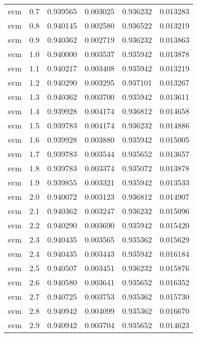 \begin{tabular}{lrrrrr}
     svm &        0.7 &    0.939565 &   0.003025 &   0.936232 &  0.013283 \\
     svm &        0.8 &    0.940145 &   0.002580 &   0.936522 &  0.013219 \\
     svm &        0.9 &    0.940362 &   0.002719 &   0.936232 &  0.013863 \\
     svm &        1.0 &    0.940000 &   0.003537 &   0.935942 &  0.013878 \\
     svm &        1.1 &    0.940217 &   0.003408 &   0.935942 &  0.013219 \\
     svm &        1.2 &    0.940290 &   0.003295 &   0.937101 &  0.013267 \\
     svm &        1.3 &    0.940362 &   0.003700 &   0.935942 &  0.013611 \\
     svm &        1.4 &    0.939928 &   0.004174 &   0.936812 &  0.014658 \\
     svm &        1.5 &    0.939783 &   0.004174 &   0.936232 &  0.014886 \\
     svm &        1.6 &    0.939928 &   0.003880 &   0.935942 &  0.015005 \\
     svm &        1.7 &    0.939783 &   0.003544 &   0.935652 &  0.013657 \\
     svm &        1.8 &    0.939783 &   0.003374 &   0.935072 &  0.013878 \\
     svm &        1.9 &    0.939855 &   0.003321 &   0.935942 &  0.013533 \\
     svm &        2.0 &    0.940072 &   0.003123 &   0.936812 &  0.014907 \\
     svm &        2.1 &    0.940362 &   0.003247 &   0.936232 &  0.015096 \\
     svm &        2.2 &    0.940290 &   0.003690 &   0.935942 &  0.015420 \\
     svm &        2.3 &    0.940435 &   0.003565 &   0.935362 &  0.015629 \\
     svm &        2.4 &    0.940435 &   0.003443 &   0.935942 &  0.016184 \\
     svm &        2.5 &    0.940507 &   0.003451 &   0.936232 &  0.015876 \\
     svm &        2.6 &    0.940580 &   0.003641 &   0.935652 &  0.016352 \\
     svm &        2.7 &    0.940725 &   0.003753 &   0.935362 &  0.015730 \\
     svm &        2.8 &    0.940942 &   0.004099 &   0.935362 &  0.016670 \\
     svm &        2.9 &    0.940942 &   0.003704 &   0.935652 &  0.014623 \\

\end{tabular}
